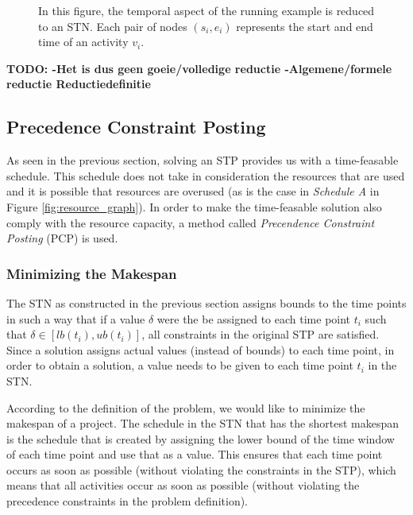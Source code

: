 \documentclass{article}
\theoremstyle{definition}
\newcommand{\TODO}[1]{{\color{red}\textbf{TODO: #1}}}
\begin{document}
\begin{figure}[h]
{
	}
	\caption{In this figure, the temporal aspect of the running example is reduced to an STN. Each pair of nodes $(s_i, e_i)$ represents the start and end time of an activity $v_i$.}
\end{figure}

\TODO{
		-Het is dus geen goeie/volledige reductie
		-Algemene/formele reductie Reductiedefinitie
	}

\subsection{Precedence Constraint Posting}
\label{text:PCP}
As seen in the previous section, solving an STP provides us with a time-feasable schedule. 
This schedule does not take in consideration the resources that are used and it is possible that resources are overused (as is the case in \emph{Schedule A} in Figure \ref{fig:resource_graph}). 
In order to make the time-feasable solution also comply with the resource capacity, a method called \emph{Precendence Constraint Posting} (PCP) is used. 

\subsubsection{Minimizing the Makespan}
The STN as constructed in the previous section assigns bounds to the time points in such a way that if a value $\delta$ were the be assigned to each time point $t_i$ such that $\delta \in [lb(t_i), ub(t_i)]$, all constraints in the original STP are satisfied.
Since a solution assigns actual values (instead of bounds) to each time point, in order to obtain a solution, a value needs to be given to each time point $t_i$ in the STN.

According to the definition of the problem, we would like to minimize the makespan of a project. The schedule in the STN that has the shortest makespan is the schedule that is created by assigning the lower bound of the time window of each time point and use that as a value. This ensures that each time point occurs as soon as possible (without violating the constraints in the STP), which means that all activities occur as soon as possible (without violating the precedence constraints in the problem definition).
\end{document}
